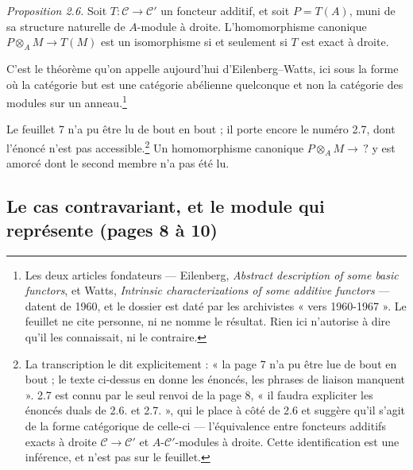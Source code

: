 \documentclass[11pt,a4paper]{article}
\begin{document}
\emph{Proposition 2.6.} Soit $T : \mathcal{C} \to \mathcal{C}'$ un foncteur
additif, et soit $P = T(A)$, muni de sa structure naturelle de $A$-module à
droite. L'homomorphisme canonique $P \otimes_{A} M \to T(M)$ est un isomorphisme
si et seulement si $T$ est exact à droite.

C'est le théorème qu'on appelle aujourd'hui d'Eilenberg--Watts, ici sous la
forme où la catégorie but est une catégorie abélienne quelconque et non la
catégorie des modules sur un anneau.\footnote{Les deux articles fondateurs —
Eilenberg, \emph{Abstract description of some basic functors}, et Watts,
\emph{Intrinsic characterizations of some additive functors} — datent de 1960,
et le dossier est daté par les archivistes « vers 1960-1967 ». Le feuillet ne
cite personne, ni ne nomme le résultat. Rien ici n'autorise à dire qu'il les
connaissait, ni le contraire.}

Le feuillet 7 n'a pu être lu de bout en bout ; il porte encore le numéro 2.7,
dont l'énoncé n'est pas accessible.\footnote{La transcription le dit
explicitement : « la page 7 n'a pu être lue de bout en bout ; le texte ci-dessus
en donne les énoncés, les phrases de liaison manquent ». 2.7 est connu par le
seul renvoi de la page 8, « il faudra expliciter les énoncés duals de 2.6. et
2.7. », qui le place à côté de 2.6 et suggère qu'il s'agit de la forme
catégorique de celle-ci — l'équivalence entre foncteurs additifs exacts à droite
$\mathcal{C} \to \mathcal{C}'$ et $A$-$\mathcal{C}'$-modules à droite. Cette
identification est une inférence, et n'est pas sur le feuillet.} Un
homomorphisme canonique $P \otimes_{A} M \to \,?$ y est amorcé dont le second
membre n'a pas été lu.

\subsection*{Le cas contravariant, et le module qui représente (pages 8 à 10)}
\end{document}
